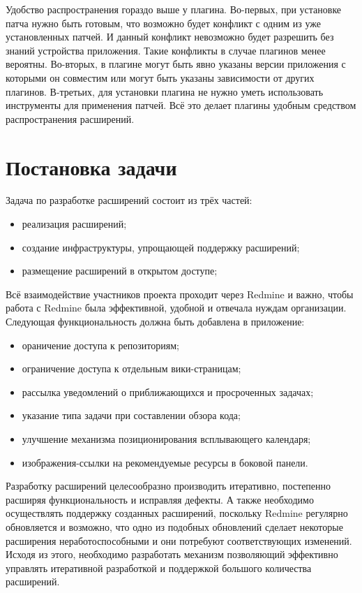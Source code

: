 Удобство распространения гораздо выше у плагина. Во-первых, при установке патча
нужно быть готовым, что возможно будет конфликт с одним из уже установленных
патчей. И данный конфликт невозможно будет разрешить без знаний устройства
приложения.
Такие конфликты в случае плагинов менее вероятны. Во-вторых, в плагине могут
быть явно указаны версии приложения с которыми он совместим или могут быть
указаны зависимости от других плагинов. В-третьих, для установки плагина не
нужно уметь использовать инструменты для применения патчей. Всё это делает
плагины удобным средством распространения расширений.


\section{Постановка задачи}
Задача по разработке расширений состоит из трёх частей:
\begin{itemize}
  \item реализация расширений;
  \item создание инфраструктуры, упрощающей поддержку расширений;
  \item размещение расширений в открытом доступе;
\end{itemize}
   
Всё взаимодействие участников проекта проходит через Redmine и важно, чтобы
работа с Redmine была эффективной, удобной и отвечала нуждам организации.
Следующая функциональность должна быть добавлена в приложение:
\begin{itemize}
  \item ораничение доступа к репозиториям;
  \item ограничение доступа к отдельным вики-страницам;
  \item рассылка уведомлений о приближающихся и просроченных
  задачах;
  \item указание типа задачи при составлении обзора кода;
  \item улучшение механизма позиционирования всплывающего календаря;
  \item изображения-ссылки на рекомендуемые ресурсы в боковой панели.
\end{itemize}

Разработку расширений целесообразно производить итеративно, постепенно расширяя
функциональность и исправляя дефекты. А также необходимо осуществлять поддержку
созданных расширений, поскольку Redmine регулярно обновляется и возможно, что
одно из подобных обновлений сделает некоторые расширения неработоспособными и
они потребуют соответствующих изменений. Исходя из этого, необходимо
разработать механизм позволяющий эффективно управлять итеративной разработкой и
поддержкой большого количества расширений.

